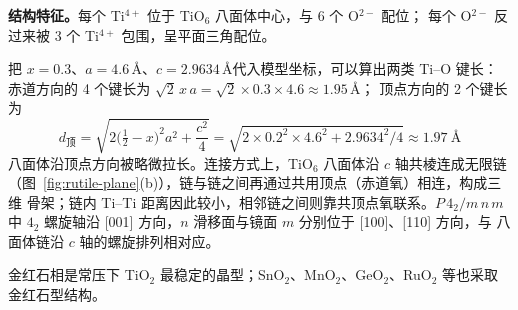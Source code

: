 \textbf{结构特征。}每个 Ti$^{4+}$ 位于 TiO$_6$ 八面体中心，与 6 个 O$^{2-}$ 配位；
每个 O$^{2-}$ 反过来被 3 个 Ti$^{4+}$ 包围，呈平面三角配位。

把 $x=0.3$、$a=4.6$\,\AA、$c=2.9634$\,\AA 代入模型坐标，可以算出两类 Ti--O 键长：
赤道方向的 4 个键长为 $\sqrt{2}\,x\,a=\sqrt{2}\times0.3\times4.6\approx1.95$\,\AA；
顶点方向的 2 个键长为
\begin{equation}
  d_{\text{顶}}=\sqrt{2\bigl(\tfrac12-x\bigr)^2a^2+\frac{c^2}{4}}
    =\sqrt{2\times0.2^2\times4.6^2+2.9634^2/4}\approx1.97\ \text{\AA}
\end{equation}
八面体沿顶点方向被略微拉长。连接方式上，TiO$_6$ 八面体沿 $c$ 轴共棱连成无限链
（图~\ref{fig:rutile-plane}(b)），链与链之间再通过共用顶点（赤道氧）相连，构成三维
骨架；链内 Ti--Ti 距离因此较小，相邻链之间则靠共顶点氧联系。$P\,4_2/m\,n\,m$ 中
$4_2$ 螺旋轴沿 [001] 方向，$n$ 滑移面与镜面 $m$ 分别位于 [100]、[110] 方向，与
八面体链沿 $c$ 轴的螺旋排列相对应。

金红石相是常压下 TiO$_2$ 最稳定的晶型；SnO$_2$、MnO$_2$、GeO$_2$、RuO$_2$ 等也采取
金红石型结构。
